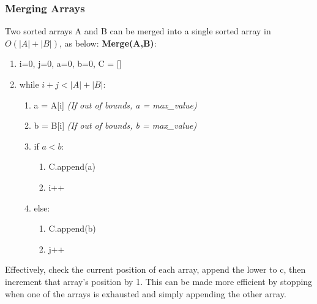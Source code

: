 \subsubsection{Merging Arrays} \label{subsubsec:Merging_Arrays}
Two sorted arrays A and B can be merged into a single sorted array in $O(|A|+|B|)$, as below:
\textbf{Merge(A,B)}:
\begin{enumerate}[label=\Alph*]
    \item i=0, j=0, a=0, b=0, C = []
    \item while \( i+j < |A|+|B|\):
\begin{enumerate}[label=\arabic*]
    \item a = A[i] \emph{(If out of bounds, a = max\_value)}
    \item b = B[i] \emph{(If out of bounds, b = max\_value)}
    \item if \(a < b\):
    \begin{enumerate}
        \item C.append(a)
        \item i++
    \end{enumerate}      
    \item [] else:
    \begin{enumerate}
        \item C.append(b)
        \item j++
    \end{enumerate}      
\end{enumerate}    
\end{enumerate}
Effectively, check the current position of each array, append the lower to c, then increment that array's position by 1. This can be made more efficient by stopping when one of the arrays is exhausted and simply appending the other array.

